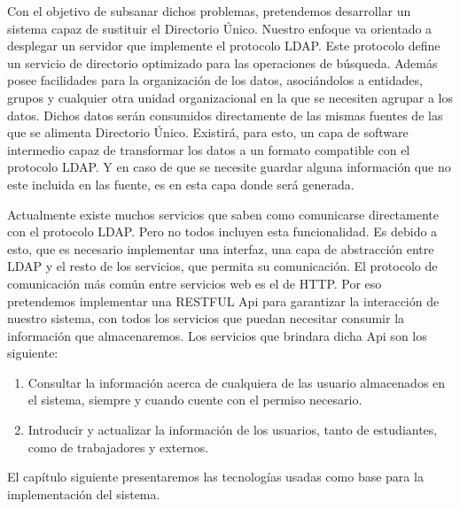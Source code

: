 Con el objetivo de subsanar dichos problemas, pretendemos desarrollar un sistema capaz de
sustituir el Directorio Único. Nuestro enfoque va orientado a desplegar un servidor que
implemente el protocolo LDAP. Este protocolo define un servicio de directorio optimizado para
las operaciones de búsqueda. Además posee facilidades para la organización de los datos, 
asociándolos a entidades, grupos y cualquier otra unidad organizacional en la que se necesiten
agrupar a los datos. Dichos datos serán consumidos directamente de las mismas fuentes de las
que se alimenta Directorio Único. Existirá, para esto, un capa de software intermedio capaz de
transformar los datos a un formato compatible con el protocolo LDAP. Y en caso de que se
necesite guardar alguna información que no este incluida en las fuente, es en esta capa donde
será generada.

Actualmente existe muchos servicios que saben como comunicarse directamente con el protocolo
LDAP. Pero no todos incluyen esta funcionalidad. Es debido a esto, que es necesario implementar
una interfaz, una capa de abstracción entre LDAP y el resto de los servicios, que permita su
comunicación. El protocolo de comunicación más común entre servicios web es el de HTTP. Por eso
pretendemos implementar una RESTFUL Api para garantizar la interacción de nuestro sistema, con
todos los servicios que puedan necesitar consumir la información que almacenaremos. Los servicios
que brindara dicha Api son los siguiente:

\begin{enumerate}
	\item Consultar la información acerca de cualquiera de las usuario almacenados en el sistema,
	siempre y cuando cuente con el permiso necesario.
	\item Introducir y actualizar la información de los usuarios, tanto de estudiantes, como de 
	trabajadores y externos.
\end{enumerate}

El capítulo siguiente presentaremos las tecnologías usadas como base para la implementación del
sistema.




